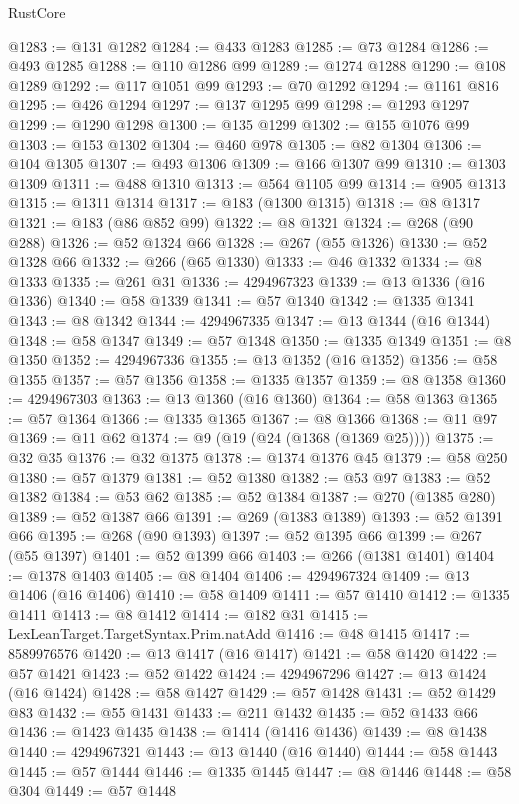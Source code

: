 \begin{lexlean}{RustCore}
\begin{coremodule}
@1283 := @131 @1282
@1284 := @433 @1283
@1285 := @73 @1284
@1286 := @493 @1285
@1288 := @110 @1286 @99
@1289 := @1274 @1288
@1290 := @108 @1289
@1292 := @117 @1051 @99
@1293 := @70 @1292
@1294 := @1161 @816
@1295 := @426 @1294
@1297 := @137 @1295 @99
@1298 := @1293 @1297
@1299 := @1290 @1298
@1300 := @135 @1299
@1302 := @155 @1076 @99
@1303 := @153 @1302
@1304 := @460 @978
@1305 := @82 @1304
@1306 := @104 @1305
@1307 := @493 @1306
@1309 := @166 @1307 @99
@1310 := @1303 @1309
@1311 := @488 @1310
@1313 := @564 @1105 @99
@1314 := @905 @1313
@1315 := @1311 @1314
@1317 := @183 (@1300 @1315)
@1318 := @8 @1317
@1321 := @183 (@86 @852 @99)
@1322 := @8 @1321
@1324 := @268 (@90 @288)
@1326 := @52 @1324 @66
@1328 := @267 (@55 @1326)
@1330 := @52 @1328 @66
@1332 := @266 (@65 @1330)
@1333 := @46 @1332
@1334 := @8 @1333
@1335 := @261 @31
@1336 := 4294967323
@1339 := @13 @1336 (@16 @1336)
@1340 := @58 @1339
@1341 := @57 @1340
@1342 := @1335 @1341
@1343 := @8 @1342
@1344 := 4294967335
@1347 := @13 @1344 (@16 @1344)
@1348 := @58 @1347
@1349 := @57 @1348
@1350 := @1335 @1349
@1351 := @8 @1350
@1352 := 4294967336
@1355 := @13 @1352 (@16 @1352)
@1356 := @58 @1355
@1357 := @57 @1356
@1358 := @1335 @1357
@1359 := @8 @1358
@1360 := 4294967303
@1363 := @13 @1360 (@16 @1360)
@1364 := @58 @1363
@1365 := @57 @1364
@1366 := @1335 @1365
@1367 := @8 @1366
@1368 := @11 @97
@1369 := @11 @62
@1374 := @9 (@19 (@24 (@1368 (@1369 @25))))
@1375 := @32 @35
@1376 := @32 @1375
@1378 := @1374 @1376 @45
@1379 := @58 @250
@1380 := @57 @1379
@1381 := @52 @1380
@1382 := @53 @97
@1383 := @52 @1382
@1384 := @53 @62
@1385 := @52 @1384
@1387 := @270 (@1385 @280)
@1389 := @52 @1387 @66
@1391 := @269 (@1383 @1389)
@1393 := @52 @1391 @66
@1395 := @268 (@90 @1393)
@1397 := @52 @1395 @66
@1399 := @267 (@55 @1397)
@1401 := @52 @1399 @66
@1403 := @266 (@1381 @1401)
@1404 := @1378 @1403
@1405 := @8 @1404
@1406 := 4294967324
@1409 := @13 @1406 (@16 @1406)
@1410 := @58 @1409
@1411 := @57 @1410
@1412 := @1335 @1411
@1413 := @8 @1412
@1414 := @182 @31
@1415 := LexLeanTarget.TargetSyntax.Prim.natAdd
@1416 := @48 @1415
@1417 := 8589976576
@1420 := @13 @1417 (@16 @1417)
@1421 := @58 @1420
@1422 := @57 @1421
@1423 := @52 @1422
@1424 := 4294967296
@1427 := @13 @1424 (@16 @1424)
@1428 := @58 @1427
@1429 := @57 @1428
@1431 := @52 @1429 @83
@1432 := @55 @1431
@1433 := @211 @1432
@1435 := @52 @1433 @66
@1436 := @1423 @1435
@1438 := @1414 (@1416 @1436)
@1439 := @8 @1438
@1440 := 4294967321
@1443 := @13 @1440 (@16 @1440)
@1444 := @58 @1443
@1445 := @57 @1444
@1446 := @1335 @1445
@1447 := @8 @1446
@1448 := @58 @304
@1449 := @57 @1448

\end{coremodule}
\end{lexlean}
